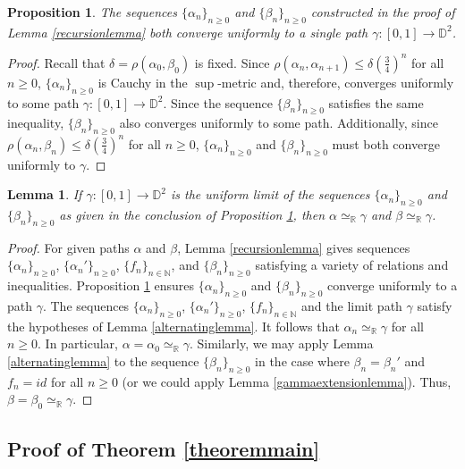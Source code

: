 \documentclass[12pt, leqno]{amsart}
\newcommand{\ui}{[0,1]}
\newcommand{\den}{\simeq_{\bbr}}
\newcommand{\bbd}{\mathbb{D}}
\newcommand{\bbn}{\mathbb{N}}
\newcommand{\bbr}{\mathbb{R}}
\newtheorem{lemma}[theorem]{Lemma}
\newtheorem{proposition}[theorem]{Proposition}
\theoremstyle{definition}\newtheorem{definition}[theorem]{Definition}
\begin{document}
\begin{proposition}\label{gammaprop}
The sequences $\{\alpha_n\}_{n\geq 0}$ and $\{\beta_n\}_{n\geq 0}$ constructed in the proof of Lemma \ref{recursionlemma} both converge uniformly to a single path $\gamma:\ui\to \bbd^2$.
\end{proposition}

\begin{proof}
Recall that $\delta=\rho(\alpha_0,\beta_0)$ is fixed. Since $\rho(\alpha_n,\alpha_{n+1})\leq \delta\left(\frac{3}{4}\right)^n$ for all $n\geq 0$, $\{\alpha_n\}_{n\geq 0}$ is Cauchy in the $\sup$-metric and, therefore, converges uniformly to some path $\gamma:\ui\to \bbd^2$. Since the sequence $\{\beta_n\}_{n\geq 0}$ satisfies the same inequality, $\{\beta_n\}_{n\geq 0}$ also converges uniformly to some path. Additionally, since $\rho(\alpha_{n},\beta_{n})\leq \delta(\frac{3}{4})^{n}$ for all $n\geq 0$, $\{\alpha_n\}_{n\geq 0}$ and $\{\beta_n\}_{n\geq 0}$ must both converge uniformly to $\gamma$.
\end{proof}

\begin{lemma}\label{denlemma}
If $\gamma:\ui\to \bbd^2$ is the uniform limit of the sequences $\{\alpha_n\}_{n\geq 0}$ and $\{\beta_n\}_{n\geq 0}$ as given in the conclusion of Proposition \ref{gammaprop}, then $\alpha\den\gamma$ and $\beta\den\gamma$.
\end{lemma}

\begin{proof}
For given paths $\alpha$ and $\beta$, Lemma \ref{recursionlemma} gives sequences $\{\alpha_n\}_{n\geq 0}$, $\{\alpha_n'\}_{n\geq 0}$, $\{f_n\}_{n\in\bbn}$, and $\{\beta_n\}_{n\geq 0}$ satisfying a variety of relations and inequalities. Proposition \ref{gammaprop} ensures $\{\alpha_n\}_{n\geq 0}$ and $\{\beta_n\}_{n\geq 0}$ converge uniformly to a path $\gamma$. The sequences $\{\alpha_n\}_{n\geq 0}$, $\{\alpha_n'\}_{n\geq 0}$, $\{f_n\}_{n\in\bbn}$ and the limit path $\gamma$ satisfy the hypotheses of Lemma \ref{alternatinglemma}. It follows that $\alpha_n\den\gamma$ for all $n\geq 0$. In particular, $\alpha=\alpha_0\den\gamma$. Similarly, we may apply Lemma \ref{alternatinglemma} to the sequence $\{\beta_n\}_{n\geq 0}$ in the case where $\beta_{n}=\beta_n'$ and $f_n=id$ for all $n\geq 0$ (or we could apply Lemma \ref{gammaextensionlemma}). Thus, $\beta=\beta_0\den \gamma$.
\end{proof}

\subsection{Proof of Theorem \ref{theoremmain}}
\end{document}
